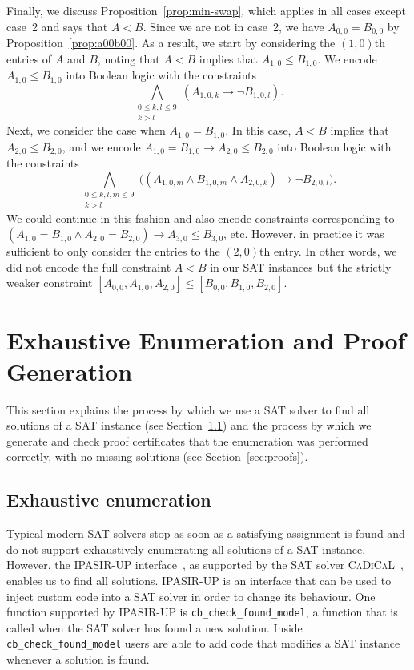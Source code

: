 \documentclass[runningheads]{llncs}
\newcommand{\limp}{\mathbin\rightarrow}
\begin{document}
Finally, we discuss Proposition~\ref{prop:min-swap}, which applies
in all cases except case~2 and says that $A<B$.
Since we are not in case~2, we have $A_{0,0}=B_{0,0}$ by Proposition~\ref{prop:a00b00}.  As a result,
we start by considering the $(1,0)$th entries of $A$ and $B$, noting that $A<B$
implies that $A_{1,0}\leq B_{1,0}$.  We encode $A_{1,0}\leq B_{1,0}$ into Boolean logic
with the constraints
\begin{equation} \bigwedge_{\substack{0\leq k,l\leq9\\k>l}}(A_{1,0,k}\limp\lnot B_{1,0,l}) . \end{equation}
Next, we consider the case when $A_{1,0}=B_{1,0}$.  In this case, $A<B$ implies that
$A_{2,0}\leq B_{2,0}$, and we encode $A_{1,0}=B_{1,0}\limp A_{2,0}\leq B_{2,0}$
into Boolean logic with the constraints
\begin{equation} \bigwedge_{\substack{0\leq k,l,m\leq9\\k>l}}\bigl((A_{1,0,m}\land B_{1,0,m}\land A_{2,0,k})\limp\lnot B_{2,0,l}\bigr) . \end{equation}
We could continue in this fashion and also encode constraints corresponding to
$(A_{1,0}=B_{1,0}\land A_{2,0}=B_{2,0})\limp A_{3,0}\leq B_{3,0}$, etc.  However, in
practice it was sufficient to only consider the entries to the $(2,0)$th entry.  In other words,
we did not encode the full constraint $A<B$ in our SAT instances
but the strictly weaker constraint $[A_{0,0},A_{1,0},A_{2,0}]\leq[B_{0,0},B_{1,0},B_{2,0}]$.

\section{Exhaustive Enumeration and Proof Generation}\label{sec:enumerating}

This section explains the process by which we use a SAT solver to
find all solutions of a SAT instance (see Section~\ref{sec:exhaustive}) and the process
by which we generate and check proof certificates that the enumeration
was performed correctly, with no missing solutions (see Section~\ref{sec:proofs}).

\subsection{Exhaustive enumeration}\label{sec:exhaustive}

Typical modern SAT solvers stop as soon as a satisfying assignment is found and do not
support exhaustively enumerating all solutions of a SAT instance.
However, the IPASIR-UP interface~\cite{Fazekas2024}, as supported by the SAT solver
\textsc{CaDiCaL}~\cite{Biere2024}, enables us to find all solutions.
IPASIR-UP is an interface that can be used to inject custom code into a SAT solver
in order to change its behaviour.  One function supported by IPASIR-UP is
\verb|cb_check_found_model|, a function that is called when the SAT solver has found a new solution.
Inside \verb|cb_check_found_model| users are able to add code that modifies a SAT instance whenever
a solution is found.
\end{document}
